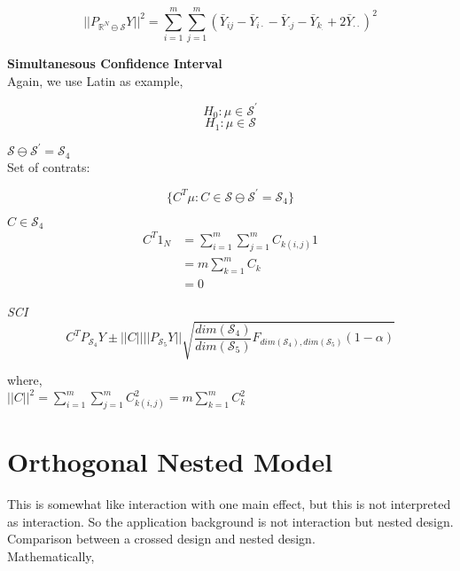 \documentclass[11pt,fleqn]{book} %
\begin{document}
		$$|| P_{\mathbb{R}^N \ominus \mathcal{S}} Y ||^2 = \sum^m_{i=1} \sum^m_{j=1} ( \bar{Y}_{ij} - \bar{Y}_{i\cdot} - \bar{Y}_{\cdot j} - \bar{Y}_{k_\cdot} + 2 \bar{Y}_{\cdot \cdot} ) ^2$$


\textbf{Simultanesous Confidence Interval}\\

Again, we use Latin as example, 

		$$H_0: \mu \in \mathcal{S}^\prime $$
		$$H_1: \mu \in \mathcal{S}$$

$\mathcal{S} \ominus \mathcal{S}^\prime = \mathcal{S}_4$\\

Set of contrats: 
		
		$$\{C^T \mu : C \in \mathcal{S} \ominus \mathcal{S}^\prime = \mathcal{S}_4  \} $$

$C \in \mathcal{S}_4$\\


\begin{align}
	C^T 1_N &= \sum^m_{i=1} \sum^m_{j=1} C_{k(i,j)} 1\\
			&= m \sum^m_{k=1}  C_{k}\\
			&= 0
\end{align}



\textit{SCI}\\

		$$C^T P_{\mathcal{S}_4} Y \pm ||C|| ||P_{\mathcal{S}_5}  Y|| \sqrt{\frac{dim(\mathcal{S}_4)}{dim(\mathcal{S}_5)} F_{dim(\mathcal{S}_4), dim(\mathcal{S}_5) } (1 - \alpha)} $$

where,\\
$||C||^2 = \sum^m_{i=1} \sum^m_{j=1} C^2_{k(i,j)} = m \sum^m_{k=1}  C^2_{k}$\\


\section{Orthogonal Nested Model}

This is somewhat like interaction with one main effect, but this is not interpreted as interaction. So the application background is not interaction but nested design. \\


Comparison between a crossed design and nested design. \\ 


Mathematically, 
\end{document}
